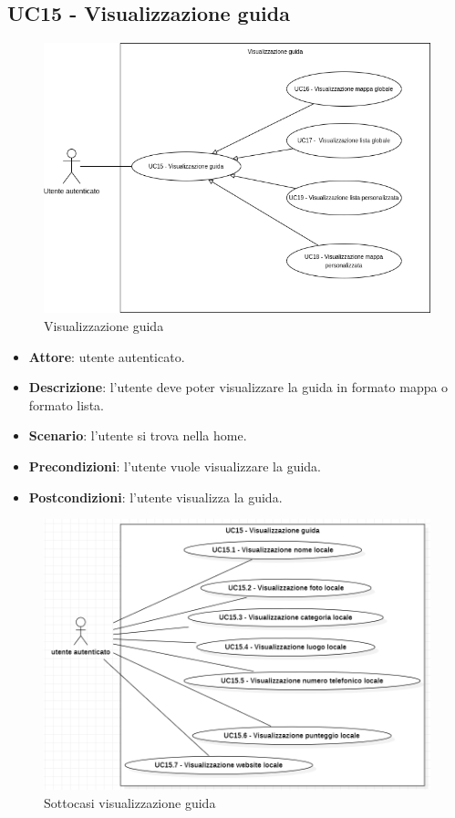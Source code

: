 \subsection{UC15 - Visualizzazione guida}

\begin{figure}[H]
    \includegraphics[width=13cm]{sezioni/Images/UC15.png}
    \centering
    \caption{Visualizzazione guida}
\end{figure}

\begin{itemize}
    \item \textbf{Attore}: utente autenticato.
    \item \textbf{Descrizione}: l'utente deve poter visualizzare la guida in formato mappa o formato lista.
    \item \textbf{Scenario}: l'utente si trova nella home.
    \item \textbf{Precondizioni}: l'utente vuole visualizzare la guida.
    \item \textbf{Postcondizioni}: l'utente visualizza la guida.
\end{itemize}

\begin{figure}[H]
    \includegraphics[width=12cm]{sezioni/Images/UC15_s.png}
    \centering
    \caption{Sottocasi visualizzazione guida}
\end{figure}

